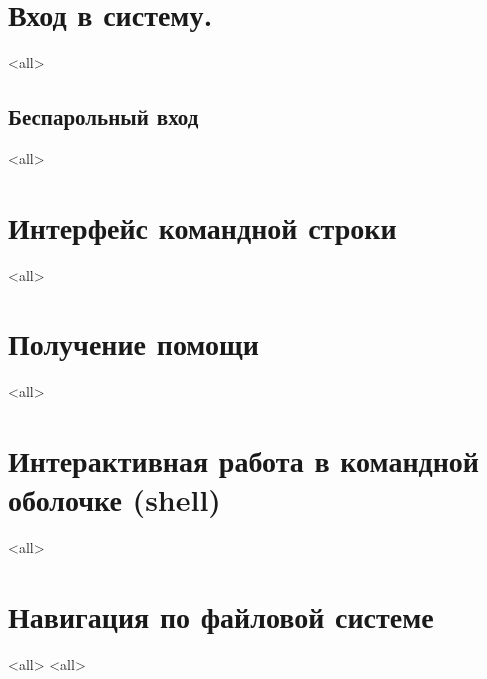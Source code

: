 \section{Вход в систему.}
\mode<all>{}
\subsection{Беспарольный вход}
\mode<all>{}

\section{Интерфейс командной строки}
\mode<all>{}

\section{Получение помощи}
\mode<all>{}

\section{Интерактивная работа в командной оболочке (shell)}
\mode<all>{}

\section{Навигация по файловой системе}
\mode<all>{}
\mode<all>{}



